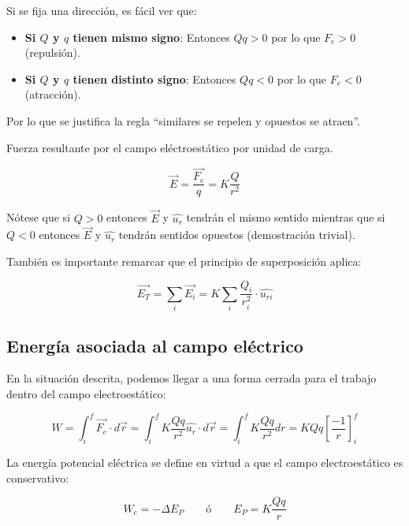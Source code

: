 \documentclass[10pt]{article}
\begin{document}
\begin{remark}
    Si se fija una dirección, es fácil ver que:
    \begin{itemize}
      \item \textbf{Si $ Q $ y $ q $ tienen mismo signo}: Entonces $ Q q > 0 $ por lo que  $ F_e > 0 $ (repulsión).
      \item \textbf{Si $ Q $ y $ q $ tienen distinto signo}: Entonces $ Q q < 0 $ por lo que  $ F_e < 0 $ (atracción).
    \end{itemize}

    Por lo que se justifica la regla ``similares se repelen y opuestos se atraen''.
\end{remark}

\begin{definition}
  Fuerza resultante por el campo eléctroestático por unidad de carga.

  \[ \vec{E} = \frac{\vec{F_e}}{q} = K\frac{Q}{r^2} \]
\end{definition}

\begin{remark}
  Nótese que si $ Q > 0 $  entonces $ \vec{E} $ y $ \hat{u_r} $ tendrán el mismo sentido mientras que si $ Q < 0 $ entonces $ \vec{E} $ y $ \hat{u_r} $ tendrán sentidos opuestos (demostración trivial).
\end{remark}

\begin{remark}
  También es importante remarcar que el principio de superposición aplica:
  
  \[ \vec{E_T} = \sum_{i} \vec{E_i} = K \sum_{i} \frac{Q_i}{r^2_i} \cdot \hat{u_{ri}}  \]
\end{remark}

\subsection{Energía asociada al campo eléctrico}

En la situación descrita, podemos llegar a una forma cerrada para el trabajo dentro del campo electroestático:

\[ W = \int_i^f \vec{F_e} \cdot d\vec{r} = \int_i^f K \frac{Q q}{r^2} \hat{u_r} \cdot d\vec{r} = \int_i^f K \frac{Q q}{r^2} dr = K Q q \left[ \frac{-1}{r} \right]_i^f  \]

\begin{definition}
  La energía potencial eléctrica se define en virtud a que el campo electroestático es conservativo:

  \[ W_c = -\Delta E_P \qquad \text{ó} \qquad E_P = K \frac{Q q}{r} \]
\end{definition}
\end{document}
